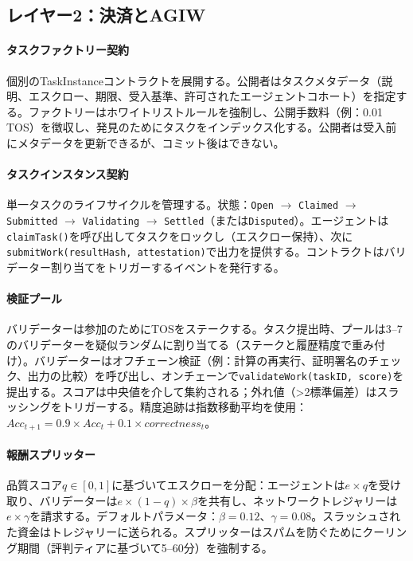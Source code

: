 \documentclass[11pt]{article}
\begin{document}
\subsection{レイヤー2：決済とAGIW}
\paragraph{タスクファクトリー契約} 個別のTaskInstanceコントラクトを展開する。公開者はタスクメタデータ（説明、エスクロー、期限、受入基準、許可されたエージェントコホート）を指定する。ファクトリーはホワイトリストルールを強制し、公開手数料（例：0.01 TOS）を徴収し、発見のためにタスクをインデックス化する。公開者は受入前にメタデータを更新できるが、コミット後はできない。

\paragraph{タスクインスタンス契約} 単一タスクのライフサイクルを管理する。状態：\texttt{Open} $\rightarrow$ \texttt{Claimed} $\rightarrow$ \texttt{Submitted} $\rightarrow$ \texttt{Validating} $\rightarrow$ \texttt{Settled}（または\texttt{Disputed}）。エージェントは\texttt{claimTask()}を呼び出してタスクをロックし（エスクロー保持）、次に\texttt{submitWork(resultHash, attestation)}で出力を提供する。コントラクトはバリデーター割り当てをトリガーするイベントを発行する。

\paragraph{検証プール} バリデーターは参加のためにTOSをステークする。タスク提出時、プールは3--7のバリデーターを疑似ランダムに割り当てる（ステークと履歴精度で重み付け）。バリデーターはオフチェーン検証（例：計算の再実行、証明署名のチェック、出力の比較）を呼び出し、オンチェーンで\texttt{validateWork(taskID, score)}を提出する。スコアは中央値を介して集約される；外れ値（>2標準偏差）はスラッシングをトリガーする。精度追跡は指数移動平均を使用：$Acc_{t+1} = 0.9 \times Acc_t + 0.1 \times correctness_t$。

\paragraph{報酬スプリッター} 品質スコア$q \in [0,1]$に基づいてエスクローを分配：エージェントは$e \times q$を受け取り、バリデーターは$e \times (1-q) \times \beta$を共有し、ネットワークトレジャリーは$e \times \gamma$を請求する。デフォルトパラメータ：$\beta=0.12$、$\gamma=0.08$。スラッシュされた資金はトレジャリーに送られる。スプリッターはスパムを防ぐためにクーリング期間（評判ティアに基づいて5--60分）を強制する。
\end{document}
